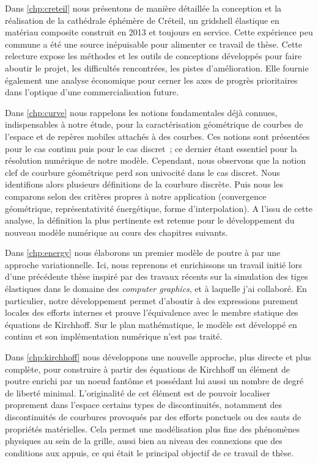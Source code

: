 Dans \cref{chp:creteil} nous présentons de manière détaillée la conception et la réalisation de la cathédrale éphémère de Créteil, un gridshell élastique en matériau composite construit en 2013 et toujours en service. Cette expérience peu commune a été une source inépuisable pour alimenter ce travail de thèse. Cette relecture expose les méthodes et les outils de conceptions développés pour faire aboutir le projet, les difficultés rencontrées, les pistes d'amélioration. Elle fournie également une analyse économique pour cerner les axes de progrès prioritaires dans l'optique d'une commercialisation future.

Dans \cref{chp:curve} nous rappelons les notions fondamentales déjà connues, indispensables à notre étude, pour la caractérisation géométrique de courbes de l'espace et de repères mobiles attachés à des courbes. Ces notions sont présentées pour le cas continu puis pour le cas discret~; ce dernier étant essentiel pour la résolution numérique de notre modèle. Cependant, nous observons que la notion clef de courbure géométrique perd son univocité dans le cas discret. Nous identifions alors plusieurs définitions de la courbure discrète. Puis nous les comparons selon des critères propres à notre application (convergence géométrique, représentativité énergétique, forme d'interpolation). A l'issu de cette analyse, la définition la plus pertinente est retenue pour le développement du nouveau modèle numérique au cours des chapitres suivants.

Dans \cref{chp:energy} nous élaborons un premier modèle de poutre à  par une approche variationnelle. Ici, nous reprenons et enrichissons un travail initié lors d'une précédente thèse inspiré par des travaux récents sur la simulation des tiges élastiques dans le domaine des \emph{computer graphics}, et à laquelle j'ai collaboré. En particulier, notre développement permet d'aboutir à des expressions purement locales des efforts internes et prouve l'équivalence avec le membre statique des équations de Kirchhoff. Sur le plan mathématique, le modèle est développé en continu et son implémentation numérique n'est pas traité.

Dans \cref{chp:kirchhoff} nous développons une nouvelle approche, plus directe et plus complète, pour construire à partir des équations de Kirchhoff un élément de poutre  enrichi par un noeud fantôme et possédant lui aussi un nombre de degré de liberté minimal. L'originalité de cet élément est de pouvoir localiser proprement dans l'espace certains types de discontinuités, notamment des discontinuités de courbures provoqués par des efforts ponctuels ou des sauts de propriétés matérielles. Cela permet une modélisation plus fine des phénomènes physiques au sein de la grille, aussi bien au niveau des connexions que des conditions aux appuis, ce qui était le principal objectif de ce travail de thèse.

